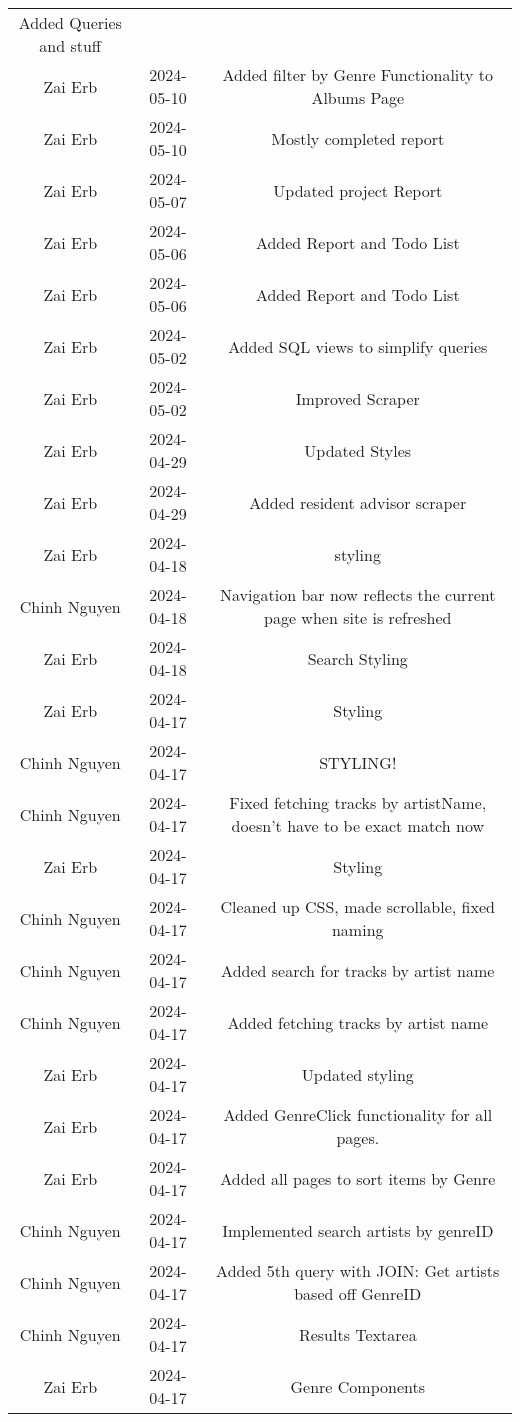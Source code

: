 \begin{tabular}{|c|c|c|}
Added Queries and stuff \\
Zai Erb & 2024-05-10 & Added filter by Genre Functionality to Albums Page \\
Zai Erb & 2024-05-10 & Mostly completed report \\
Zai Erb & 2024-05-07 & Updated project Report \\
Zai Erb & 2024-05-06 & Added Report and Todo List \\
Zai Erb & 2024-05-06 & Added Report and Todo List \\
Zai Erb & 2024-05-02 & Added SQL views to simplify queries \\
Zai Erb & 2024-05-02 & Improved Scraper \\
Zai Erb & 2024-04-29 & Updated Styles \\
Zai Erb & 2024-04-29 & Added resident advisor scraper \\
Zai Erb & 2024-04-18 & styling \\
Chinh Nguyen & 2024-04-18 & Navigation bar now reflects the current page when site is refreshed \\
Zai Erb & 2024-04-18 & Search Styling \\
Zai Erb & 2024-04-17 & Styling \\
Chinh Nguyen & 2024-04-17 & STYLING! \\
Chinh Nguyen & 2024-04-17 & Fixed fetching tracks by artistName, doesn't have to be exact match now \\
Zai Erb & 2024-04-17 & Styling \\
Chinh Nguyen & 2024-04-17 & Cleaned up CSS, made scrollable, fixed naming \\
Chinh Nguyen & 2024-04-17 & Added search for tracks by artist name \\
Chinh Nguyen & 2024-04-17 & Added fetching tracks by artist name \\
Zai Erb & 2024-04-17 & Updated styling \\
Zai Erb & 2024-04-17 & Added GenreClick functionality for all pages. \\
Zai Erb & 2024-04-17 & Added all pages to sort items by Genre \\
Chinh Nguyen & 2024-04-17 & Implemented search artists by genreID \\
Chinh Nguyen & 2024-04-17 & Added 5th query with JOIN: Get artists based off GenreID \\
Chinh Nguyen & 2024-04-17 & Results Textarea \\
Zai Erb & 2024-04-17 & Genre Components \\

\end{tabular}
